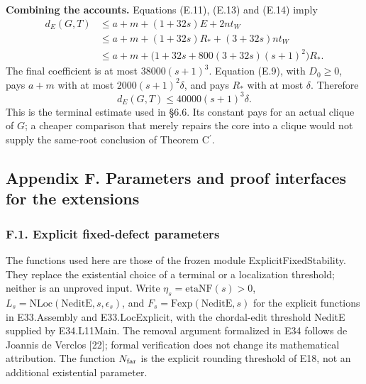 \documentclass[english,11pt,a4paper]{article}
\begin{document}
\textbf{Combining the accounts.} Equations (E.11), (E.13) and (E.14) imply \[
\begin{aligned}
d_E(G,T)&\le a+m+(1+32s)E+2nt_W\\
&\le a+m+(1+32s)R_*+(3+32s)nt_W\\
&\le a+m+\bigl(1+32s+800(3+32s)(s+1)^2\bigr)R_*.
\end{aligned}
\] The final coefficient is at most \(38000(s+1)^3\). Equation (E.9), with \(D_0\ge0\), pays \(a+m\) with at most \(2000(s+1)^2\delta\), and pays \(R_*\) with at most \(\delta\). Therefore \[
d_E(G,T)\le40000(s+1)^3\delta.
\] This is the terminal estimate used in §6.6. Its constant pays for an actual clique of \(G\); a cheaper comparison that merely repairs the core into a clique would not supply the same-root conclusion of Theorem \texorpdfstring{C\ensuremath{^{\prime}}}{C'}.

\subsection{Appendix F. Parameters and proof interfaces for the extensions}\label{appendix-f.-parameters-and-proof-interfaces-for-the-extensions}

\subsubsection{F.1. Explicit fixed-defect parameters}\label{f.1.-explicit-fixed-defect-parameters}

The functions used here are those of the frozen module ExplicitFixedStability. They replace the existential choice of a terminal or a localization threshold; neither is an unproved input. Write \(\eta_s=\mathrm{etaNF}(s)>0\), \(L_s=\mathrm{NLoc}(\mathrm{NeditE},s,\epsilon_s)\), and \(F_s=\mathrm{Fexp}(\mathrm{NeditE},s)\) for the explicit functions in E33.Assembly and E33.LocExplicit, with the chordal-edit threshold NeditE supplied by E34.L11Main. The removal argument formalized in E34 follows de Joannis de Verclos {[}22{]}; formal verification does not change its mathematical attribution. The function \(N_{\rm far}\) is the explicit rounding threshold of E18, not an additional existential parameter.
\end{document}
